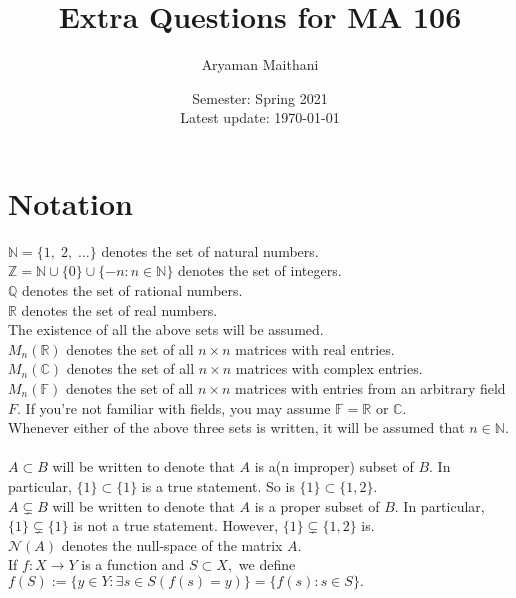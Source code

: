 \documentclass[12pt]{article}
\title{Extra Questions for MA 106}
\author{Aryaman Maithani}%
\date{Semester: Spring 2021\\ Latest update: \today}
\begin{document}
\maketitle
\tableofcontents
\hrulefill
\setcounter{section}{-1}
\section{Notation}

$\mathbb{N} = \{1,\; 2,\; \ldots\}$ denotes the set of natural numbers.\\
$\mathbb{Z} = \mathbb{N} \cup \{0\} \cup \{-n : n\in\mathbb{N}\}$ denotes the set of integers.\\
$\mathbb{Q}$ denotes the set of rational numbers.\\
$\mathbb{R}$ denotes the set of real numbers.\\
The existence of all the above sets will be assumed.\\
$M_n(\mathbb{R})$ denotes the set of all $n\times n$ matrices with real entries.\\
$M_n(\mathbb{C})$ denotes the set of all $n\times n$ matrices with complex entries.\\
$M_n(\mathbb{F})$ denotes the set of all $n\times n$ matrices with entries from an arbitrary field $F.$ If you're not familiar with fields, you may assume $\mathbb{F} = \mathbb{R}$ or $\mathbb{C}.$\\
Whenever either of the above three sets is written, it will be assumed that $n \in \mathbb{N}.$\\~\\
$A \subset B$ will be written to denote that $A$ is a(n improper) subset of $B.$ In particular, $\{1\} \subset \{1\}$ is a true statement. So is $\{1\} \subset \{1, 2\}.$\\
$A \subsetneq B$ will be written to denote that $A$ is a proper subset of $B.$ In particular, $\{1\} \subsetneq \{1\}$ is not a true statement. However, $\{1\} \subsetneq \{1, 2\}$ is.\\
$\mathcal{N}(A)$ denotes the null-space of the matrix $A.$\\
If $f:X\to Y$ is a function and $S \subset X,$ we define $f(S) := \{y \in Y : \exists s \in S(f(s) = y)\} = \{f(s) : s \in S\}.$

\hrulefill
\end{document}
